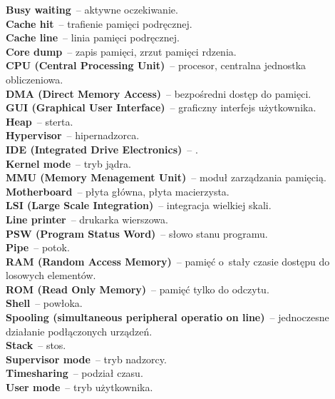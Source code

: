 \documentclass[a4paper,11pt]{article}
\begin{document}
\noindent
\textbf{Busy waiting}~-- aktywne oczekiwanie. \\
\textbf{Cache hit}~-- trafienie pamięci podręcznej. \\
\textbf{Cache line}~-- linia pamięci podręcznej. \\
\textbf{Core dump}~-- zapis pamięci, zrzut pamięci rdzenia. \\
\textbf{CPU (Central Processing Unit)}~-- procesor, centralna jednostka
obliczeniowa. \\
\textbf{DMA (Direct Memory Access)}~-- bezpośredni dostęp do pamięci. \\
\textbf{GUI (Graphical User Interface)}~-- graficzny interfejs użytkownika. \\
\textbf{Heap}~-- sterta. \\
\textbf{Hypervisor}~-- hipernadzorca. \\
\textbf{IDE (Integrated Drive Electronics)}~-- . \\
\textbf{Kernel mode}~-- tryb jądra. \\
\textbf{MMU (Memory Menagement Unit)}~-- moduł zarządzania pamięcią. \\
\textbf{Motherboard}~-- płyta główna, płyta macierzysta. \\
\textbf{LSI (Large Scale Integration)}~-- integracja wielkiej skali. \\
\textbf{Line printer}~-- drukarka wierszowa. \\
\textbf{PSW (Program Status Word)}~-- słowo stanu programu. \\
\textbf{Pipe}~-- potok. \\
\textbf{RAM (Random Access Memory)}~-- pamięć o~stały czasie dostępu do
losowych elementów. \\
\textbf{ROM (Read Only Memory)}~-- pamięć tylko do odczytu. \\
\textbf{Shell}~-- powłoka. \\
\textbf{Spooling (simultaneous peripheral operatio on line)}~-- jednoczesne
działanie podłączonych urządzeń. \\
\textbf{Stack}~-- stos. \\
\textbf{Supervisor mode}~-- tryb nadzorcy. \\
\textbf{Timesharing}~-- podział czasu. \\
\textbf{User mode}~-- tryb użytkownika. \\
\end{document}
